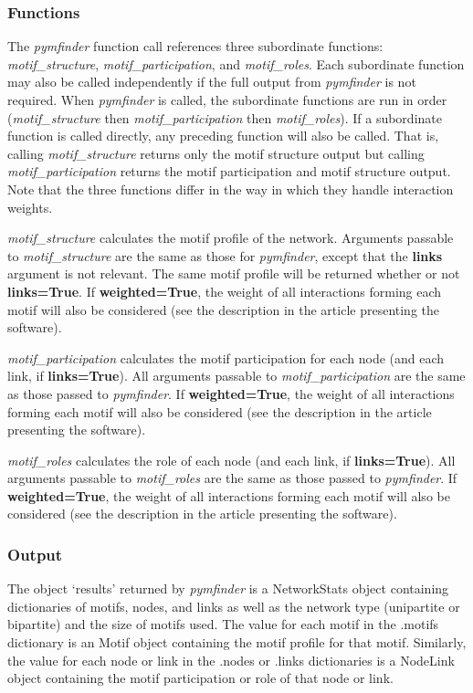 \documentclass[12pt]{article}
\begin{document}
		\subsubsection{Functions}
			The \emph{pymfinder} function call references three subordinate functions: \emph{motif\_structure}, \emph{motif\_participation}, and \emph{motif\_roles}. Each subordinate function may also be called independently if the full output from \emph{pymfinder} is not required. When \emph{pymfinder} is called, the subordinate functions are run in order (\emph{motif\_structure} then \emph{motif\_participation} then \emph{motif\_roles}). If a subordinate function is called directly, any preceding function will also be called. That is, calling \emph{motif\_structure} returns only the motif structure output but calling \emph{motif\_participation} returns the motif participation and motif structure output. Note that the three functions differ in the way in which they handle interaction weights.

			\emph{motif\_structure} calculates the motif profile of the network. Arguments passable to \emph{motif\_structure} are the same as those for \emph{pymfinder}, except that the \textbf{links} argument is not relevant. The same motif profile will be returned whether or not \textbf{links=True}. If \textbf{weighted=True}, the weight of all interactions forming each motif will also be considered (see the description in the article presenting the software).

			\emph{motif\_participation} calculates the motif participation for each node (and each link, if \textbf{links=True}). All arguments passable to \emph{motif\_participation} are the same as those passed to \emph{pymfinder}. If \textbf{weighted=True}, the weight of all interactions forming each motif will also be considered (see the description in the article presenting the software).

			\emph{motif\_roles} calculates the role of each node (and each link, if \textbf{links=True}). All arguments passable to \emph{motif\_roles} are the same as those passed to \emph{pymfinder}. If \textbf{weighted=True}, the weight of all interactions forming each motif will also be considered (see the description in the article presenting the software).

		\subsubsection{Output}
			The object `results' returned by \emph{pymfinder} is a NetworkStats object containing dictionaries of motifs, nodes, and links as well as the network type (unipartite or bipartite) and the size of motifs used. The value for each motif in the .motifs dictionary is an Motif object containing the motif profile for that motif. Similarly, the value for each node or link in the .nodes or .links dictionaries is a NodeLink object containing the motif participation or role of that node or link.
\end{document}
